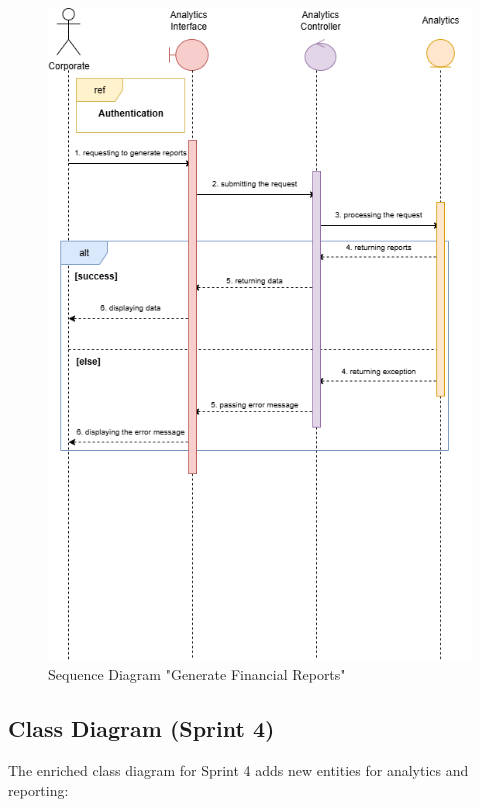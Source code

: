 \begin{figure}[H] 
  \centering
  \includegraphics[width=\textwidth,keepaspectratio]{images/seq_generate_financial_reports.png}
  \caption{Sequence Diagram "Generate Financial Reports"}
  \label{fig:seq_generate_reports}
\end{figure}

\subsection{Class Diagram (Sprint 4)}

The enriched class diagram for Sprint 4 adds new entities for analytics and reporting:

